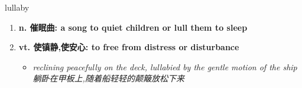 
\begin{frame}
{\huge lullaby}
\begin{center}
\begin{enumerate}\Large
  \item \textbf{n. 催眠曲: a song to quiet children or lull them to sleep}
  \item \textbf{vt. 使镇静,使安心: to free from distress or disturbance}
  \begin{itemize}
    \item \em{\Large{reclining peacefully on the deck, lullabied by the gentle motion of the ship 躺卧在甲板上,随着船轻轻的颠簸放松下来}}
  \end{itemize}
\end{enumerate}
\end{center}
\end{frame}

